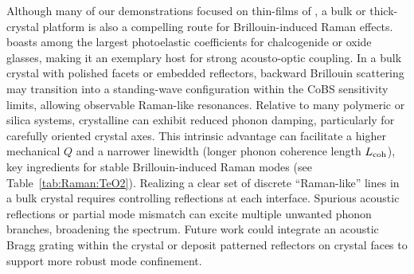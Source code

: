 %

Although many of our demonstrations focused on thin-films of , a bulk or thick-crystal platform is also a compelling route for Brillouin-induced Raman effects.  boasts among the largest photoelastic coefficients for chalcogenide or oxide glasses, making it an exemplary host for strong acousto-optic coupling. In a bulk crystal with polished facets or embedded reflectors, backward Brillouin scattering may transition into a standing-wave configuration within the \ac{CoBS} sensitivity limits, allowing observable Raman-like resonances. Relative to many polymeric or silica systems, crystalline  can exhibit reduced phonon damping, particularly for carefully oriented crystal axes. This intrinsic advantage can facilitate a higher mechanical \(Q\) and a narrower linewidth (longer phonon coherence length \(L_{\rm coh}\)), key ingredients for stable Brillouin-induced Raman modes (see Table~\ref{tab:Raman:TeO2}). Realizing a clear set of discrete ``Raman-like'' lines in a bulk crystal requires controlling reflections at each interface. Spurious acoustic reflections or partial mode mismatch can excite multiple unwanted phonon branches, broadening the spectrum. Future work could integrate an acoustic Bragg grating within the crystal or deposit patterned reflectors on crystal faces to support more robust mode confinement.

